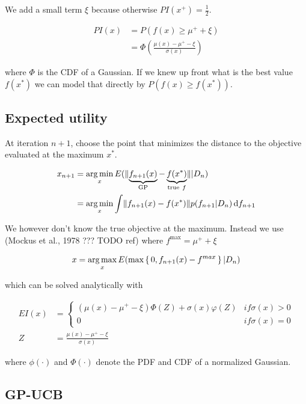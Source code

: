 We add a small term $\xi$ because otherwise $PI(x^+) = \frac{1}{2}.$

\begin{align}
  PI(x) &= P(f(x) \geq \mu^+ + \xi) \\
        &= \Phi \left(\frac{\mu(x) - \mu^+ - \xi}{\sigma(x)} \right)
\end{align}

where $\Phi$ is the CDF of a Gaussian. If we knew up front what is the best
value $f(x^*)$ we can model that directly by $P(f(x) \geq f(x^*))$.


\subsection{Expected utility}

At iteration $n+1$, choose the point that minimizes the distance to the
objective evaluated at the maximum $x^*$.

\begin{align}
  x_{n+1} &= \operatorname*{arg\,min}_x E(\lVert \underbrace{f_{n+1}(x)}_{\text{GP}} - \underbrace{f(x^*)}_{\text{true}\ f} \rVert | D_n) \\
          &=\operatorname*{arg\,min}_x \int \lVert f_{n+1}(x) - f(x^*)\rVert p(f_{n+1} | D_n) \mathop{}\!\mathrm{d} f_{n+1}
\end{align}

We however don't know the true objective at the maximum. Instead we use (Mockus
et al., 1978 ??? TODO ref) where $f^{\max} = \mu^+ + \xi$

\begin{equation}
  x = \operatorname*{arg\,max}_x E(\max\set{0, f_{n+1}(x) - f^{max}}|D_n)
\end{equation}

which can be solved analytically with

\begin{align}
  EI(x) &= \begin{cases}
    (\mu(x) - \mu^+ - \xi) \Phi(Z) + \sigma(x)\varphi(Z) & if \sigma(x) > 0 \\
    0 & if \sigma(x) = 0
  \end{cases} \\
  Z &= \frac{\mu(x) - \mu^+ - \xi}{\sigma(x)}
\end{align}

where $\phi(\cdot)$ and $\Phi(\cdot)$ denote the PDF and CDF of a normalized Gaussian.


\subsection{GP-UCB}

